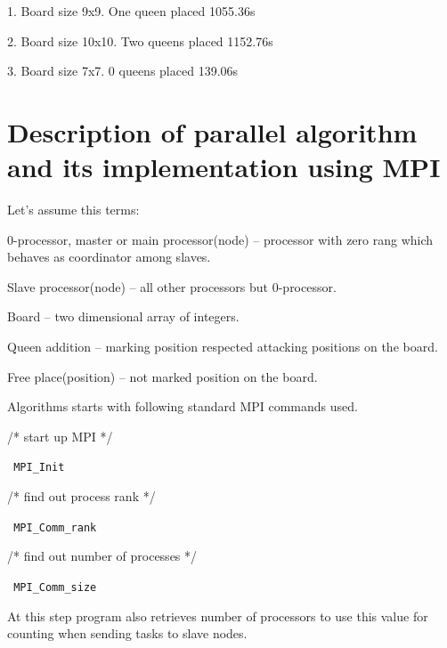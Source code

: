 \documentclass[12pt]{article}
\begin{document}
1.   Board size 9x9. One queen placed 1055.36s

2.   Board size 10x10. Two queens placed 1152.76s

3.   Board size 7x7. 0 queens placed 139.06s
       









\section{Description of parallel algorithm and its implementation using MPI}









Let's assume this terms:

0-processor, master or main processor(node) -- processor with zero rang which behaves as coordinator among slaves.

Slave processor(node) -- all other processors but 0-processor.

Board -- two dimensional array of integers.

Queen addition -- marking position respected attacking positions on the board.

Free place(position) -- not marked position on the board.

Algorithms starts with following standard MPI commands used.

/* start up MPI */

\verb| MPI_Init |

/* find out process rank */

\verb| MPI_Comm_rank |

/* find out number of processes */

\verb| MPI_Comm_size |

At this step program also retrieves number of processors to use this value for counting when sending tasks to slave nodes.
\end{document}
